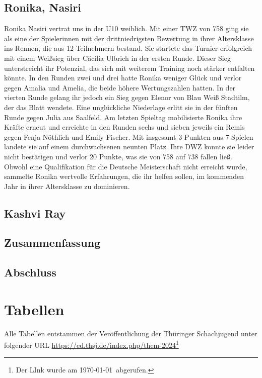 \documentclass[a4paper,ngerman]{tui-algo-seminar}
\begin{document}
\subsection{Ronika, Nasiri}
Ronika Nasiri vertrat uns in der U10 weiblich. Mit einer TWZ von 758 ging sie als eine der Spielerinnen mit der drittniedrigsten Bewertung in ihrer Altersklasse ins Rennen, die aus 12 Teilnehmern bestand. Sie startete das Turnier erfolgreich mit einem Weißsieg über Cäcilia Ulbrich in der ersten Runde. Dieser Sieg unterstreicht ihr Potenzial, das sich mit weiterem Training noch stärker entfalten könnte. In den Runden zwei und drei hatte Ronika weniger Glück und verlor gegen Amalia und Amelia, die beide höhere Wertungszahlen hatten. In der vierten Runde gelang ihr jedoch ein Sieg gegen Elenor von Blau Weiß Stadtilm, der das Blatt wendete. Eine unglückliche Niederlage erlitt sie in der fünften Runde gegen Julia aus Saalfeld. Am letzten Spieltag mobilisierte Ronika ihre Kräfte erneut und erreichte in den Runden sechs und sieben jeweils ein Remis gegen Fenja Nöthlich und Emily Fischer. Mit insgesamt 3 Punkten aus 7 Spielen landete sie auf einem durchwachsenen neunten Platz. Ihre DWZ konnte sie leider nicht bestätigen und verlor 20 Punkte, was sie von 758 auf 738 fallen ließ. Obwohl eine Qualifikation für die Deutsche Meisterschaft nicht erreicht wurde, sammelte Ronika wertvolle Erfahrungen, die ihr helfen sollen, im kommenden Jahr in ihrer Altersklasse zu dominieren.

\subsection{Kashvi Ray}


\subsection{Zusammenfassung}


\subsection{Abschluss}


\clearpage
\section{Tabellen}
Alle Tabellen entstammen der Veröffentlichung der Thüringer Schachjugend unter folgender URL \url{https://ed.thsj.de/index.php/them-2024}\footnote{Der LInk wurde am \today ~abgerufen.}
\end{document}
